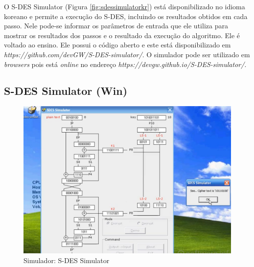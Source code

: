 O S-DES Simulator (Figura \ref{fig:sdessimulatorkr}) está disponibilizado no idioma koreano e permite a execução do S-DES, incluindo os resultados obtidos em cada passo. Nele pode-se informar os parâmetros de entrada que ele utiliza para mostrar os resultados dos passos e o resultado da execução do algoritmo. Ele é voltado ao ensino. Ele possui o código aberto e este está disponibilizado em \textit{https://github.com/devGW/S-DES-simulator/}. O simulador pode ser utilizado em \textit{browsers} pois está \textit{online} no endereço \textit{https://devgw.github.io/S-DES-simulator/}. \cite{woo18}


\subsection{S-DES Simulator (Win)}

\begin{figure}[H]
    \centering
    \caption{Simulador: S-DES Simulator}
    \label{fig:sdessimulatoren}
    \includegraphics[width=1.2\linewidth,center]{Simuladores/SDESSimulatorXp.png}
\end{figure}

